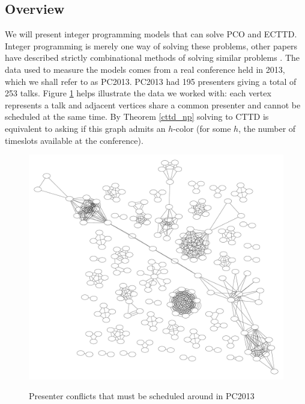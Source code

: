 \documentclass[]{article}
\theoremstyle{definition}
\theoremstyle{remark}
\numberwithin{equation}{section}
\begin{document}
\subsection{Overview}
We will present integer programming models that can solve PCO and ECTTD. Integer programming is merely one way of solving these problems, other papers have described strictly combinational methods of solving similar problems \cite{cheng}. The data used to measure the models comes from a real conference held in 2013, which we shall refer to as PC2013. PC2013 had 195 presenters giving a total of 253 talks. Figure \ref{fig_pc2013_graph} helps illustrate the data we worked with: each vertex represents a talk and adjacent vertices share a common presenter and cannot be scheduled at the same time. By Theorem \ref{cttd_np} solving to CTTD is equivalent to asking if this graph admits an $h$-color (for some $h$, the number of timeslots available at the conference).
\begin{figure}[h!]
	\caption{Presenter conflicts that must be scheduled around in PC2013}
	\centering
	\includegraphics[scale=0.2]{penguiconconflict}
	\label{fig_pc2013_graph}
\end{figure}
\end{document}
